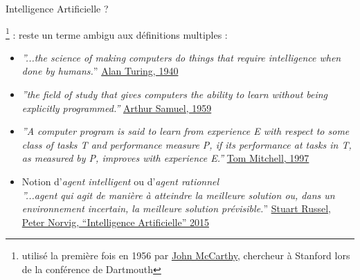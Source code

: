 \documentclass[10pt,serif,mathserif,compress,hyperref={colorlinks}]{beamer}
\begin{document}
\begin{frame}{Intelligence Artificielle ?}

  \footnote{{\tiny utilisé la première fois en 1956 par \href{https://en.wikipedia.org/wiki/John\_McCarthy\_\%28computer\_scientist\%29}{John McCarthy},
      chercheur à Stanford lors de la conférence de Dartmouth}} :
  reste un terme ambigu aux définitions multiples :

  \begin{itemize}

  \item {\em ''...the science of making computers do things that require intelligence when done by humans.}''
    {\tiny \href{http://www.alanturing.net/turing\_archive/pages/reference\%20articles/what\%20is\%20ai.html}{Alan Turing, 1940}}\\[3mm]    

  \item {\em ''the field of study that gives computers the ability to learn without being explicitly programmed.''}
        {\tiny  \href{http://infolab.stanford.edu/pub/voy/museum/samuel.html}{Arthur Samuel, 1959}}

  \item {\em ''A computer program is said to learn from experience E with respect to some class of tasks T and performance measure P,
    if its performance at tasks in T, as measured by P, improves with experience E.''}
    {\tiny \href{https://www.cs.cmu.edu/~tom/}{Tom Mitchell, 1997}}

  \item Notion d'{\em agent intelligent} ou d'{\em agent rationnel}\\
    {\em ''...agent qui agit de manière à
    atteindre la meilleure solution ou, dans un environnement incertain, la meilleure solution prévisible.}''
    {\tiny  \hyperlink{refRusselNorvig}{Stuart Russel, Peter Norvig, ``Intelligence Artificielle'' 2015}}

  \end{itemize}

\end{frame}
\end{document}
